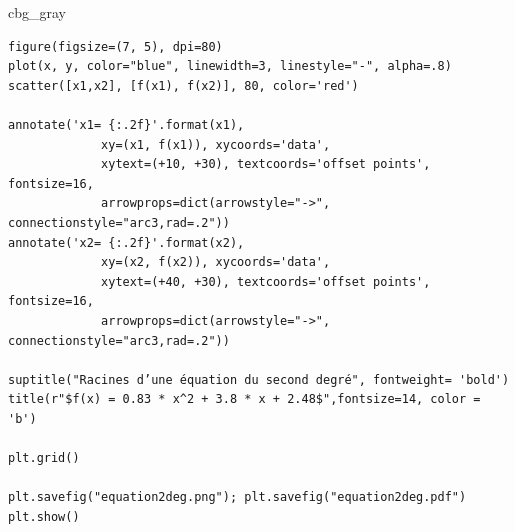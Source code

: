 \documentclass[%
oneside,                 %
final,                   %
10pt,french]{article}
\newenvironment{_cod_tight}[1]{
   \def\FrameCommand{\colorbox{#1}}
   \FrameRule0.6pt\MakeFramed {\FrameRestore}\vskip3mm}
   {\vskip0mm\endMakeFramed}
\newenvironment{cod}[1]{
\bgroup\rmfamily
\fboxsep=0mm\relax
\begin{_cod_tight}{#1}
\list{}{\parsep=-2mm\parskip=0mm\topsep=0pt\leftmargin=2mm
\rightmargin=2\leftmargin\leftmargin=4pt\relax}
\item\relax}
{\endlist\end{_cod_tight}\egroup}
\newenvironment{doconceexercise}{}{}
\begin{document}
\begin{doconceexercise}
\begin{cod}{cbg_gray}
\begin{verbatim}
figure(figsize=(7, 5), dpi=80)
plot(x, y, color="blue", linewidth=3, linestyle="-", alpha=.8)
scatter([x1,x2], [f(x1), f(x2)], 80, color='red')

annotate('x1= {:.2f}'.format(x1),
             xy=(x1, f(x1)), xycoords='data',
             xytext=(+10, +30), textcoords='offset points', fontsize=16,
             arrowprops=dict(arrowstyle="->", connectionstyle="arc3,rad=.2"))
annotate('x2= {:.2f}'.format(x2),
             xy=(x2, f(x2)), xycoords='data',
             xytext=(+40, +30), textcoords='offset points', fontsize=16,
             arrowprops=dict(arrowstyle="->", connectionstyle="arc3,rad=.2"))

suptitle("Racines d’une équation du second degré", fontweight= 'bold')
title(r"$f(x) = 0.83 * x^2 + 3.8 * x + 2.48$",fontsize=14, color = 'b')

plt.grid()

plt.savefig("equation2deg.png"); plt.savefig("equation2deg.pdf")
plt.show()
\end{verbatim}
\end{cod}
\noindent


\end{doconceexercise}
\end{document}

